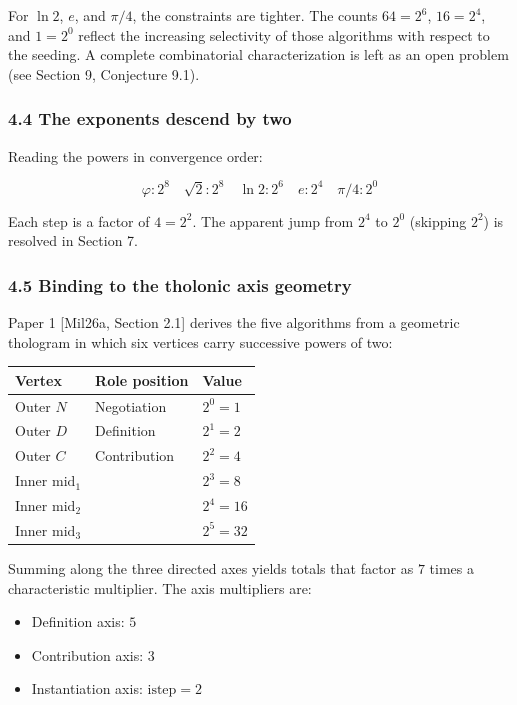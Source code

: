 \documentclass[
  11pt,
  letterpaper,
]{article}
\providecommand{\tightlist}{%
  \setlength{\itemsep}{0pt}\setlength{\parskip}{0pt}}
\begin{document}
For \(\ln 2\), \(e\), and \(\pi/4\), the constraints are tighter. The
counts \(64 = 2^6\), \(16 = 2^4\), and \(1 = 2^0\) reflect the
increasing selectivity of those algorithms with respect to the seeding.
A complete combinatorial characterization is left as an open problem
(see Section 9, Conjecture 9.1).

\subsubsection{4.4 The exponents descend by
two}\label{the-exponents-descend-by-two}

Reading the powers in convergence order:

\[
\varphi: 2^8 \quad \sqrt{2}: 2^8 \quad \ln 2: 2^6 \quad e: 2^4 \quad \pi/4: 2^0
\]

Each step is a factor of \(4 = 2^2\). The apparent jump from \(2^4\) to
\(2^0\) (skipping \(2^2\)) is resolved in Section 7.

\subsubsection{4.5 Binding to the tholonic axis
geometry}\label{binding-to-the-tholonic-axis-geometry}

Paper 1 {[}Mil26a, Section 2.1{]} derives the five algorithms from a
geometric thologram in which six vertices carry successive powers of
two:

\begin{longtable}[]{@{}lll@{}}
\toprule\noalign{}
Vertex & Role position & Value \\
\midrule\noalign{}
\endhead
\bottomrule\noalign{}
\endlastfoot
Outer \(N\) & Negotiation & \(2^0 = 1\) \\
Outer \(D\) & Definition & \(2^1 = 2\) \\
Outer \(C\) & Contribution & \(2^2 = 4\) \\
Inner \(\mathrm{mid}_1\) & & \(2^3 = 8\) \\
Inner \(\mathrm{mid}_2\) & & \(2^4 = 16\) \\
Inner \(\mathrm{mid}_3\) & & \(2^5 = 32\) \\
\end{longtable}

Summing along the three directed axes yields totals that factor as \(7\)
times a characteristic multiplier. The axis multipliers are:

\begin{itemize}
\tightlist
\item
  Definition axis: \(5\)
\item
  Contribution axis: \(3\)
\item
  Instantiation axis: \(\mathrm{istep} = 2\)
\end{itemize}
\end{document}
